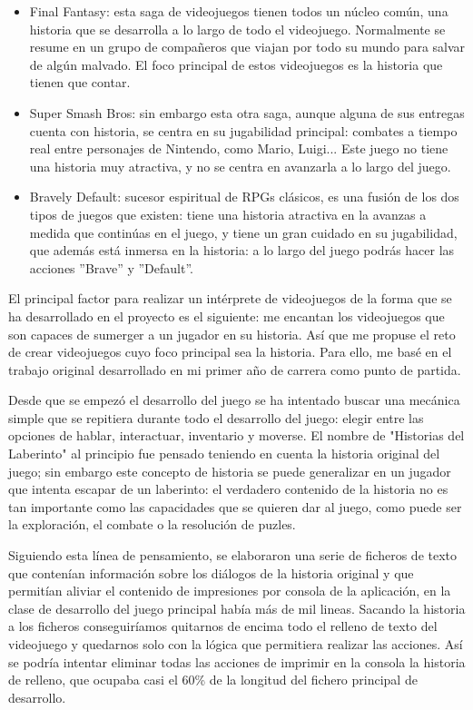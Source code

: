 \begin{itemize}
	\item Final Fantasy: esta saga de videojuegos tienen todos un núcleo común, una historia que se desarrolla a lo largo de todo el videojuego. Normalmente se resume en un grupo de compañeros que viajan por todo su mundo para salvar de algún malvado. El foco principal de estos videojuegos es la historia que tienen que contar.
	\item Super Smash Bros: sin embargo esta otra saga, aunque alguna de sus entregas cuenta con historia, se centra en su jugabilidad principal: combates a tiempo real entre personajes de Nintendo, como Mario, Luigi... Este juego no tiene una historia muy atractiva, y no se centra en avanzarla a lo largo del juego.
	\item Bravely Default: sucesor espiritual de RPGs clásicos, es una fusión de los dos tipos de juegos que existen: tiene una historia atractiva en la avanzas a medida que continúas en el juego, y tiene un gran cuidado en su jugabilidad, que además está inmersa en la historia: a lo largo del juego podrás hacer las acciones ''Brave'' y ''Default''.
\end{itemize} 

El principal factor para realizar un intérprete de videojuegos de la forma que se ha desarrollado en el proyecto es el siguiente: me encantan los videojuegos que son capaces de sumerger a un jugador en su historia. Así que me propuse el reto de crear videojuegos cuyo foco principal sea la historia. Para ello, me basé en el trabajo original desarrollado en mi primer año de carrera como punto de partida.

Desde que se empezó el desarrollo del juego se ha intentado buscar una mecánica simple que se repitiera durante todo el desarrollo del juego: elegir entre las opciones de hablar, interactuar, inventario y moverse. 
El nombre de "Historias del Laberinto" al principio fue pensado teniendo en cuenta la historia original del juego; sin embargo este concepto de historia se puede generalizar en un jugador que intenta escapar de un laberinto: el verdadero contenido de la historia no es tan importante como las capacidades que se quieren dar al juego, como puede ser la exploración, el combate o la resolución de puzles.

Siguiendo esta línea de pensamiento, se elaboraron una serie de ficheros de texto que contenían información sobre los diálogos de la historia original y que permitían aliviar el contenido de impresiones por consola de la aplicación, en la clase de desarrollo del juego principal había más de mil lineas.
Sacando la historia a los ficheros conseguiríamos quitarnos de encima todo el relleno de texto del videojuego y quedarnos solo con la lógica que permitiera realizar las acciones. Así se podría intentar eliminar todas las acciones de imprimir en la consola la historia de relleno, que ocupaba casi el 60\% de la longitud del fichero principal de desarrollo.

